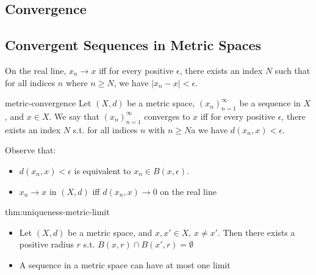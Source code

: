 \documentclass[landscape, 8pt]{extarticle}
\begin{document}
\begin{multicols}{3}
\section{Convergence}

\subsection{Convergent Sequences in Metric Spaces}
On the real line, $x_{n}\to x$ iff for every positive $\epsilon$, there exists an index $N$ such that for all indices $n$ where $n\ge N$, we have $\lvert x_{n} - x \rvert < \epsilon$.

\begin{dfn}{metric-convergence}{}
    Let $(X,d)$ be a metric space, $(x_{n})^{\infty}_{n=1}$ be a sequence in $X$, and $x\in X$. We say that $(x_{n})^{\infty}_{n=1}$ converges to $x$ iff for every positive $\epsilon$, there exists an index $N$ s.t. for all indices $n$ with $n\ge N$a we have $d(x_{n}, x) < \epsilon$.

    Observe that:
    \begin{itemize}
        \item $d(x_{n}, x)< \epsilon$ is equivalent to $x_{n}\in B(x,\epsilon)$.
        \item $x_{n}\to x$ in $(X,d)$ iff $d(x_{n}, x)\to 0$ on the real line
    \end{itemize}
\end{dfn}

\begin{thm}{thm:uniqueness-metric-limit}{}
    \begin{itemize}
        \item Let $(X,d)$ be a metric space, and $x,x'\in X,\,x\ne x'$. Then there exists a positive radius $r$ s.t. $B(x,r)\cap B(x',r) = \emptyset$
        \item A sequence in a metric space can have at most one limit
    \end{itemize}
\end{thm}

%
%
%


\end{multicols}
\end{document}
